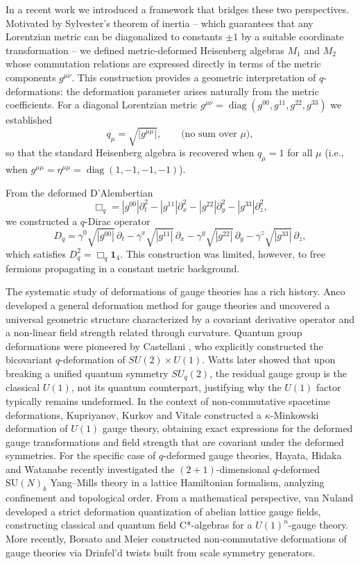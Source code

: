 \documentclass[12pt,a4paper]{article}
\theoremstyle{plain}
\theoremstyle{definition}
\begin{document}
In a recent work \cite{Jaramillo2026a} we introduced a framework that bridges these two perspectives. Motivated by Sylvester’s theorem of inertia – which guarantees that any Lorentzian metric can be diagonalized to constants \(\pm1\) by a suitable coordinate transformation – we defined metric‑deformed Heisenberg algebras \(M_1\) and \(M_2\) whose commutation relations are expressed directly in terms of the metric components \(g^{\mu\nu}\). This construction provides a geometric interpretation of \(q\)-deformations: the deformation parameter arises naturally from the metric coefficients. For a diagonal Lorentzian metric \(g^{\mu\nu}=\operatorname{diag}(g^{00},g^{11},g^{22},g^{33})\) we established
\[
q_\mu = \sqrt{|g^{\mu\mu}|}, \qquad \text{(no sum over }\mu\text{)},
\]
so that the standard Heisenberg algebra is recovered when \(q_\mu=1\) for all \(\mu\) (i.e., when \(g^{\mu\mu}=\eta^{\mu\mu}=\operatorname{diag}(1,-1,-1,-1)\)).

From the deformed D’Alembertian
\[
\Box_q = |g^{00}|\partial_t^2 - |g^{11}|\partial_x^2 - |g^{22}|\partial_y^2 - |g^{33}|\partial_z^2,
\]
we constructed a \(q\)-Dirac operator
\[
D_q = \gamma^0\sqrt{|g^{00}|}\,\partial_t - \gamma^x\sqrt{|g^{11}|}\,\partial_x - \gamma^y\sqrt{|g^{22}|}\,\partial_y - \gamma^z\sqrt{|g^{33}|}\,\partial_z,
\]
which satisfies \(D_q^2 = \Box_q \mathbf{1}_4\). This construction was limited, however, to free fermions propagating in a constant metric background.

The systematic study of deformations of gauge theories has a rich history. Anco \cite{Anco2004} developed a general deformation method for gauge theories and uncovered a universal geometric structure characterized by a covariant derivative operator and a non‑linear field strength related through curvature. Quantum group deformations were pioneered by Castellani \cite{Castellani1992}, who explicitly constructed the bicovariant \(q\)-deformation of \(SU(2)\times U(1)\). Watts \cite{Watts1997} later showed that upon breaking a unified quantum symmetry \(SU_q(2)\), the residual gauge group is the classical \(U(1)\), not its quantum counterpart, justifying why the \(U(1)\) factor typically remains undeformed. In the context of non‑commutative spacetime deformations, Kupriyanov, Kurkov and Vitale \cite{Kupriyanov2020} constructed a \(\kappa\)-Minkowski deformation of \(U(1)\) gauge theory, obtaining exact expressions for the deformed gauge transformations and field strength that are covariant under the deformed symmetries. For the specific case of \(q\)-deformed gauge theories, Hayata, Hidaka and Watanabe \cite{Hayata2026} recently investigated the \((2+1)\)-dimensional \(q\)-deformed \(\mathrm{SU}(N)_k\) Yang–Mills theory in a lattice Hamiltonian formalism, analyzing confinement and topological order. From a mathematical perspective, van Nuland \cite{vanNuland2021} developed a strict deformation quantization of abelian lattice gauge fields, constructing classical and quantum field C*-algebras for a \(U(1)^n\)-gauge theory. More recently, Borsato and Meier \cite{BorsatoMeier2025} constructed non‑commutative deformations of gauge theories via Drinfel’d twists built from scale symmetry generators.
\end{document}
